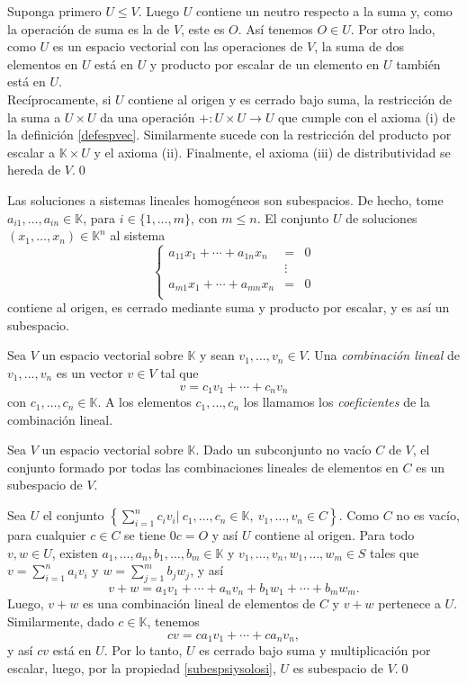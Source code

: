 \dem Suponga primero $U\le V$. Luego $U$ contiene un neutro respecto a la suma y, como la operaci\'on de suma es la de $V$, este es $O$. As\'i tenemos $O\in U$. Por otro lado, como $U$ es un espacio vectorial con las operaciones de $V$, la suma de dos elementos en $U$ est\'a en $U$ y producto por escalar de un elemento en $U$ tambi\'en est\'a en $U$.\\
Rec\'iprocamente, si $U$ contiene al origen y es cerrado bajo suma, la restricci\'on de la suma a $U\times U$ da una operaci\'on $+:U\times U\rightarrow U$ que cumple con el axioma (i) de la definici\'on \ref{defespvec}. Similarmente sucede con la restricci\'on del producto por escalar a $\mathbb{K}\times U$ y el axioma (ii). Finalmente, el axioma (iii) de distributividad se hereda de $V$.\qed

\begin{ejem}
Las soluciones a sistemas lineales homogéneos son subespacios. De hecho, tome $a_{i1},\ldots,a_{in}\in \mathbb{K}$, para $i\in\{1,\ldots,m\}$, con $m\le n$. El conjunto $U$ de soluciones $(x_1,\ldots,x_n)\in\mathbb{K}^n$ al sistema
$$\left\{
\begin{array}{lcr}
  a_{11}x_1+\cdots+a_{1n}x_n & = & 0\\
   & \vdots & \\
  a_{m1}x_1+\cdots+a_{mn}x_n & = & 0\\
\end{array}
\right.$$
contiene al origen, es cerrado mediante suma y producto por escalar, y es así un subespacio.
\end{ejem}

\begin{defn}
Sea $V$ un espacio vectorial sobre $\mathbb{K}$ y sean $v_1,\ldots,v_n\in V$. Una \emph{combinaci\'on lineal} de  $v_1,\ldots,v_n$ es un vector $v\in V$ tal que
\[
v=c_1v_1+\cdots+c_nv_n
\]
con $c_1,\ldots,c_n\in\mathbb{K}$. A los elementos $c_1,\ldots,c_n$ los llamamos los \emph{coeficientes} de la combinaci\'on lineal.
\end{defn}

\begin{prop}
Sea $V$ un espacio vectorial sobre $\mathbb{K}$. Dado un subconjunto no vac\'io $C$ de $V$, el conjunto formado por todas las combinaciones lineales de elementos en $C$ es un subespacio de $V$.
\end{prop}

\dem Sea $U$ el conjunto $\left\{\sum_{i=1}^nc_iv_i\Big|\ c_1,\ldots,c_n\in \mathbb{K},\ v_1,\ldots,v_n\in C \right\}$. Como $C$ no es vacío, para cualquier $c\in C$ se tiene $0c=O$ y así $U$ contiene al origen.
Para todo $v,w\in U$, existen $a_1,\ldots,a_n,b_1,\ldots,b_m\in \mathbb{K}$ y $v_1,\ldots,v_n,w_1,\ldots,w_m\in S$ tales que $v=\sum_{i=1}^n a_iv_i$ y $w=\sum_{j=1}^m b_jw_j$, y así
\[
v+w=a_1v_1+\cdots+a_nv_n+b_1w_1+\cdots+b_mw_m.
\]
Luego, $v+w$ es una combinaci\'on lineal de elementos de $C$ y $v+w$ pertenece a $U$. Similarmente, dado $c\in \mathbb{K}$, tenemos
\[
cv=ca_1v_1+\cdots+ca_nv_n,
\]
y as\'i $cv$ est\'a en $U$. Por lo tanto, $U$ es cerrado bajo suma y multiplicaci\'on por escalar, luego, por la propiedad \ref{subespsiysolosi}, $U$ es subespacio de $V$.\qed

